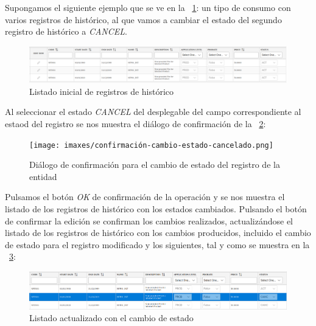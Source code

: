 Supongamos el siguiente ejemplo que se ve en la \figurename~\ref{fig:listado-tipos-cuotas-inicial}: un tipo de consumo con varios registros de histórico, al que vamos a cambiar el estado del segundo registro de histórico a \emph{CANCEL}.

\begin{figure}[H]
  \centering
  \includegraphics[width=\textwidth]{imaxes/listado-tipos-cuotas-inicial.png}
  \caption{Listado inicial de registros de histórico}
  \label{fig:listado-tipos-cuotas-inicial}
\end{figure}


Al seleccionar el estado \emph{CANCEL} del desplegable del campo correspondiente al estaod del registro se nos muestra el diálogo de confirmación de la \figurename~\ref{fig:confirmación-cambio-estado-cancelado}:

\begin{figure}[H]
  \centering
  \texttt{[image: imaxes/confirmación-cambio-estado-cancelado.png]}
  \caption{Diálogo de confirmación para el cambio de estado del registro de la entidad}
  \label{fig:confirmación-cambio-estado-cancelado}
\end{figure}


Pulsamos el botón \emph{OK} de confirmación de la operación y se nos muestra el listado de los registros de histórico con los estados cambiados. Pulsando el botón de confirmar la edición se confirman los cambios realizados, actualizándose el listado de los registros de histórico con los cambios producidos, incluido el cambio de estado para el registro modificado y los siguientes, tal y como se muestra en la \figurename~\ref{fig:cambio-estado-cancelado}:

\begin{figure}[H]
  \centering
  \includegraphics[width=\textwidth]{imaxes/cambio-estado-cancelado.png}
  \caption{Listado actualizado con el cambio de estado}
  \label{fig:cambio-estado-cancelado}
\end{figure}




